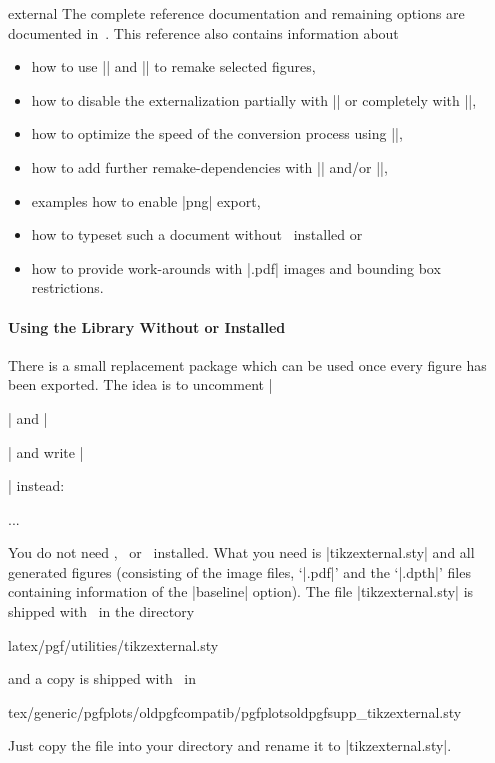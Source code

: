 {\begin{pgfplotslibrary}{external}
The complete reference documentation and remaining options are documented in~\cite[``Externalization Library'']{tikz}. This reference also contains information about
\begin{itemize}
	\item how to use || and || to remake selected figures,
	\item how to disable the externalization partially with || or completely with |\tikzexternaldisable|,
	\item how to optimize the speed of the conversion process using |\tikzset{external/optimize command away=\myExpensiveMacro}|,
	\item how to add further remake-dependencies with |\tikzpicturedependsonfile| and/or  |\tikzexternalfiledependsonfile|,
	\item examples how to enable |png| export,
	\item how to typeset such a document without \pgfname\ installed or
	\item how to provide work-arounds with |.pdf| images and bounding box restrictions.
\end{itemize}

\paragraph{Using the Library Without {\normalfont\pgfname} or {\normalfont\PGFPlots} Installed}
There is a small replacement package  which can be used once every figure has been exported. The idea is to uncomment |\usepackage{tikz}| and |\usepackage{pgfplots}| and write |\usepackage{tikzexternal}| instead:
\begin{codeexample}
\usepackage{tikzexternal}
\tikzexternalize%


...

\end{codeexample}
You do not need \pgfname, \tikzname\ or \PGFPlots\ installed. What you need is |tikzexternal.sty| and all generated figures (consisting of the image files, `|.pdf|' and the `|.dpth|' files containing information of the |baseline| option). The file |tikzexternal.sty| is shipped with \pgfname\ in the directory
\begin{codeexample}
latex/pgf/utilities/tikzexternal.sty
\end{codeexample}
and a copy is shipped with \PGFPlots\ in
\begin{codeexample}
tex/generic/pgfplots/oldpgfcompatib/pgfplotsoldpgfsupp_tikzexternal.sty
\end{codeexample}
Just copy the file into your directory and rename it to |tikzexternal.sty|.


\end{pgfplotslibrary}}

